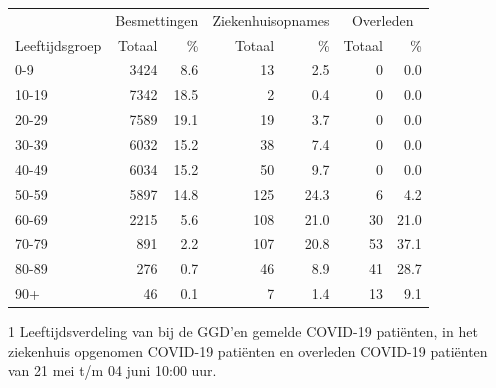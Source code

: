 \documentclass[
  english,
  man,floatsintext]{apa6}
\begin{document}
\begin{table}
\centering\begingroup\fontsize{11}{13}\selectfont

\begin{threeparttable}
\begin{tabular}{lrrrrrr}
\toprule
\multicolumn{1}{c}{ } & \multicolumn{2}{c}{Besmettingen} & \multicolumn{2}{c}{Ziekenhuisopnames} & \multicolumn{2}{c}{Overleden} \\
\cmidrule(l{3pt}r{3pt}){2-3} \cmidrule(l{3pt}r{3pt}){4-5} \cmidrule(l{3pt}r{3pt}){6-7}
Leeftijdsgroep & Totaal & \% & Totaal & \% & Totaal & \%\\
\midrule
0-9 & 3424 & 8.6 & 13 & 2.5 & 0 & 0.0\\
10-19 & 7342 & 18.5 & 2 & 0.4 & 0 & 0.0\\
20-29 & 7589 & 19.1 & 19 & 3.7 & 0 & 0.0\\
30-39 & 6032 & 15.2 & 38 & 7.4 & 0 & 0.0\\
40-49 & 6034 & 15.2 & 50 & 9.7 & 0 & 0.0\\
50-59 & 5897 & 14.8 & 125 & 24.3 & 6 & 4.2\\
60-69 & 2215 & 5.6 & 108 & 21.0 & 30 & 21.0\\
70-79 & 891 & 2.2 & 107 & 20.8 & 53 & 37.1\\
80-89 & 276 & 0.7 & 46 & 8.9 & 41 & 28.7\\
90+ & 46 & 0.1 & 7 & 1.4 & 13 & 9.1\\
\bottomrule
\end{tabular}
\begin{tablenotes}
\item[1] Leeftijdsverdeling van bij de GGD’en gemelde COVID-19 patiënten, in het ziekenhuis opgenomen COVID-19 patiënten en overleden COVID-19 patiënten van 21 mei t/m 04 juni 10:00 uur.
\end{tablenotes}
\end{threeparttable}
\endgroup{}
\end{table}

\newpage
\end{document}
